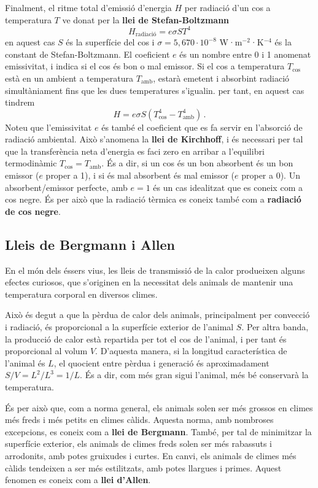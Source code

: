 \documentclass[12pt]{book}
\begin{document}
Finalment, el ritme total d'emissió d'energia $H$ per radiació d'un cos a temperatura $T$ ve donat per la {\bf llei de Stefan-Boltzmann}
%
\begin{equation}
    \boxed{H_\text{radiació} = e \sigma S T^4}
\end{equation}
%
en aquest cas $S$ és la superfície del cos i $\sigma = 5,670 \cdot 10^{-8}$ W·m$^{-2}$·K$^{-4}$ és la constant de Stefan-Boltzmann. El coeficient $e$ és un nombre entre 0 i 1 anomenat emissivitat, i indica si el cos és bon o mal emissor. Si el cos a temperatura $T_\text{cos}$ està en un ambient a temperatura $T_\text{amb}$, estarà emetent i absorbint radiació simultàniament fins que les dues temperatures s'igualin. per tant, en aquest cas tindrem 
%
\begin{equation}
    H = e \sigma S \left(T_\text{cos}^4 - T_\text{amb}^4\right)\, .
\end{equation}
%
Noteu que l'emissivitat $e$ és també el coeficient que es fa servir en l'absorció de radiació ambiental. Això s'anomena la {\bf llei de Kirchhoff}, i és necessari per tal que la transferència neta d'energia es faci zero en arribar a l'equilibri termodinàmic $T_\text{cos} = T_\text{amb}$. És a dir, si un cos és un bon absorbent és un bon emissor ($e$ proper a 1), i si és mal absorbent és mal emissor ($e$ proper a 0). Un absorbent/emissor perfecte, amb $e = 1$ és un cas idealitzat que es coneix com a cos negre. És per això que la radiació tèrmica es coneix també com a {\bf radiació de cos negre}.

\subsection{Lleis de Bergmann i Allen}

En el món dels éssers vius, les lleis de transmissió de la calor produeixen alguns efectes curiosos, que s'originen en la necessitat dels animals de mantenir una temperatura corporal en diversos climes. 

Això és degut a que la pèrdua de calor dels animals, principalment per convecció i radiació, és proporcional a la superfície exterior de l'animal $S$. Per altra banda, la producció de calor està repartida per tot el cos de l'animal, i per tant és proporcional al volum $V$. D'aquesta manera, si la longitud característica de l'animal és $L$, el quocient entre pèrdua i generació és aproximadament $S/V = L^2/L^3 = 1/L$. És a dir, com més gran sigui l'animal, més bé conservarà la temperatura.

És per això que, com a norma general, els animals solen ser més grossos en climes més freds i més petits en climes càlids. Aquesta norma, amb nombroses excepcions, es coneix com a {\bf llei de Bergmann}. També, per tal de minimitzar la superfície exterior, els animals de climes freds solen ser més rabassuts i arrodonits, amb potes gruixudes i curtes. En canvi, els animals de climes més càlids tendeixen a ser més estilitzats, amb potes llargues i primes. Aquest fenomen es coneix com a {\bf llei d'Allen}. 
\end{document}
